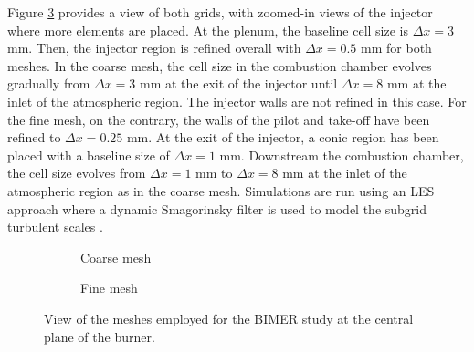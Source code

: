 
Figure \ref{fig:BIMER_meshes} provides a view of both grids, with zoomed-in views of the injector where more elements are placed. At the plenum, the baseline cell size is $\Delta x = 3$ mm. Then, the injector region is refined overall with $\Delta x = 0.5$ mm for both meshes. In the coarse mesh, the cell size in the combustion chamber  evolves gradually from $\Delta x = 3$ mm at the exit of the injector until $\Delta x = 8$ mm at the inlet of the atmospheric region. The injector walls are not refined in this case. For the fine mesh, on the contrary, the walls of the pilot and take-off have been refined to $\Delta x = 0.25$ mm. At the exit of the injector, a conic region has been placed with a baseline size of $\Delta x = 1$ mm. Downstream the combustion chamber, the cell size evolves from $\Delta x = 1$ mm to $\Delta x = 8$ mm at the inlet of the atmospheric region as in the coarse mesh. Simulations are run using an LES approach where a dynamic Smagorinsky filter is used to model the subgrid turbulent scales .

\newpage

\begin{figure}[ht]
\centering
\begin{subfigure}[b]{1.0\textwidth}
	\centering
   \caption{Coarse mesh}
   \label{fig:BIMER_mesh_fine} 
\end{subfigure}
\begin{subfigure}[b]{1.0\textwidth}
	\centering
   \caption{Fine mesh}
   \label{fig:BIMER_mesh_fine}
\end{subfigure}
\caption{View of the meshes employed for the BIMER study at the central plane of the burner.}
\label{fig:BIMER_meshes}
\end{figure}


